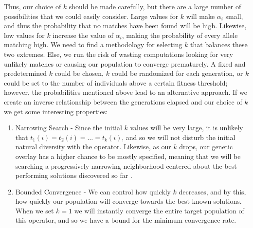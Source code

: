 Thus, our choice of $k$ should be made carefully, but there are a large number of possibilities that we could easily consider. Large values for $k$ will make $\alpha_i$ small, and thus the probability that no matches have been found will be high. Likewise, low values for $k$ increase the value of $\alpha_i$, making the probability of every allele matching high. We need to find a methodology for selecting $k$ that balances these two extremes. Else, we run the risk of wasting computations looking for very unlikely matches or causing our population to converge prematurely. A fixed and predetermined $k$ could be chosen, $k$ could be randomized for each generation, or $k$ could be set to the number of individuals above a certain fitness threshold; however, the probabilities mentioned above lead to an alternative approach. If we create an inverse relationship between the generations elapsed and our choice of $k$ we get some interesting properties:

\begin{enumerate}

\item Narrowing Search - Since the initial $k$ values will be very large, it is unlikely that $t_1(i) = t_2(i) = \ldots = t_k(i)$, and so we will not disturb the initial natural diversity with the operator.  Likewise, as our $k$ drops, our genetic overlay has a higher chance to be mostly specified, meaning that we will be searching a progressively narrowing neighborhood centered about the best performing solutions discovered so far \cite{Neri11}.

\item Bounded Convergence - We can control how quickly $k$ decreases, and by this, how quickly our population will converge towards the best known solutions. When we set $k=1$ we will instantly converge the entire target population of this operator, and so we have a bound for the minimum convergence rate.

\end{enumerate}

%
%
%
